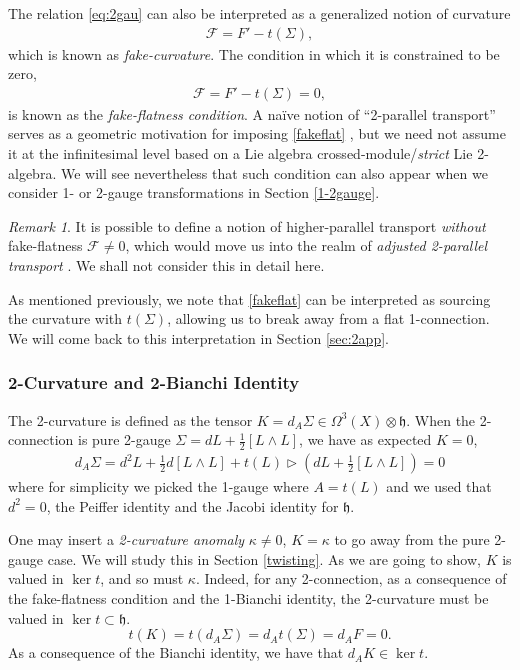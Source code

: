 \documentclass[onecolumn]{article}
\theoremstyle{theorem}
\theoremstyle{remark}
\newtheorem{remark}{Remark}[section]
\theoremstyle{example}
\theoremstyle{definition}
\numberwithin{equation}{section}
\newcommand{\beq}{\begin{eqnarray}}
\newcommand{\eeq}{\end{eqnarray}}
\def\ker{\operatorname{ker}}
\def\h{\mathfrak h}
\begin{document}
 

The relation  \eqref{eq:2gau} can also be interpreted as a generalized notion of curvature 
\beq
\mathcal{F}= F'-t(\Sigma),\nonumber
\eeq
which is known as {\it {fake-curvature}}. The condition in which it is constrained to be zero,
\beq\label{fakeflat}
\mathcal{F}= F'-t(\Sigma)=0,
\eeq
is known as the \textit{{fake-flatness condition}}. A na{\" i}ve notion of ``2-parallel transport'' serves as a geometric motivation for imposing  \eqref{fakeflat} \cite{Yekuteli:2015}, but we need not assume it at the infinitesimal level based on a Lie algebra crossed-module/\textit{{strict}} Lie 2-algebra. We will see nevertheless that such condition can also appear when we consider 1- or 2-gauge transformations in Section \ref{1-2gauge}. 

\begin{remark}\label{adjpt}
It is possible to define a notion of higher-parallel transport \textit{without} fake-flatness $\mathcal{F}\neq 0$, which would move us into the realm of \textit{adjusted 2-parallel transport} \cite{Kim:2019owc}. We shall not consider this in detail here.
\end{remark}

As mentioned previously, we note that  \eqref{fakeflat} can be interpreted as sourcing the curvature with $t(\Sigma)$, allowing us to break away from a flat 1-connection. We will come back to this interpretation in Section \ref{sec:2app}.





\subsubsection{2-Curvature and 2-Bianchi Identity}
The 2-curvature is defined as the tensor $K=d_A\Sigma\in \Omega^3(X)\otimes \h$. When the 2-connection is pure 2-gauge $\Sigma=dL+\frac12[L\wedge L]$, we have as expected $K=0$,
\begin{align}
    d_A\Sigma = d^2L + \frac12d[L\wedge L]+ t(L)\rhd (dL+\frac12[L\wedge L])=0
\end{align}
where for simplicity we picked the 1-gauge where  $A=t(L)$ and we used that $d^2=0$, the Peiffer identity and the Jacobi identity for $\mathfrak{h}$.  

One may insert a {\it {2-curvature anomaly}} $\kappa\neq0$,  $K=\kappa$ to go away from the pure 2-gauge case. We will study this in Section \ref{twisting}.  As we are going to show, $K$ is valued in $\operatorname{ker}t$, and so must $\kappa$. Indeed, for any 2-connection, as a consequence of the fake-flatness condition and the 1-Bianchi identity, the 2-curvature must be valued in $\operatorname{ker}t\subset \mathfrak{h}$. 
\begin{equation} \label{Kkert}
t(K)= t(d_{A}\Sigma)= d_{A} t(\Sigma)   =d_{A} F=0.      
\end{equation}
{As} a consequence of the Bianchi identity, we  have that $d_AK\in \ker t$. 
\end{document}
